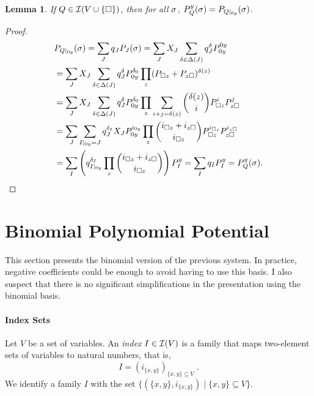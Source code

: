 \documentclass[nocopyrightspace,preprint]{sigplanconf-pldi15}
\newtheorem{lemma}{Lemma}
\begin{document}
\begin{lemma}
If $Q \in \mathcal{I}(V \cup \{\square\})$, then for all $\sigma$,
$P^y_Q(\sigma) = P_{Q|_{0y}}(\sigma)$.
\end{lemma}
\begin{proof}
\begin{align*}
&P_{Q|_{0y}}(\sigma)
  = \sum_J q_J P_J(\sigma)
  = \sum_J X_J \sum_{\delta \in \Delta(J)} q_J^\delta P_{0y}^{0y} \\
&= \sum_J X_J \sum_{\delta \in \Delta(J)}
    q_J^\delta P_{0y}^{\delta_0}
    \prod_z (P_{\square z} + P_{z \square})^{\delta(z)} \\
&= \sum_J X_J \sum_{\delta \in \Delta(J)}
    q_J^\delta P_{0y}^{\delta_0}
    \prod_z \sum_{i+j=\delta(z)} \binom{\delta(z)}{i}
      P_{\square z}^i P_{z \square}^j \\
&= \sum_J \sum_{I|_{0y} = J}
    q_J^{\delta_I} X_J P_{0y}^{i_{0y}}
    \prod_z \binom{i_{\square z} + i_{z \square}}{i_{\square z}}
      P_{\square z}^{i_{\square z}} P_{z \square}^{i_{z \square}} \\
&= \sum_I
    \left( q_{I|_{0y}}^{\delta_I}
    \prod_z \binom{i_{\square z} + i_{z \square}}{i_{\square z}}
    \right) P_I^y
  = \sum_I q_I P_I^y = P^y_Q(\sigma).
\end{align*}
\end{proof}














\clearpage
\section{Binomial Polynomial Potential}

This section presents the binomial version of the previous system.
In practice, negative coefficients could be enough to avoid having to use
this basis.  I also suspect that there is no significant simplifications
in the presentation using the binomial basis.

\paragraph{Index Sets}

Let $V$ be a set of variables.  An \emph{index} $I \in \mathcal{I}(V)$ is a
family that maps two-element sets of variables to natural numbers,
that is,
$$
I = (i_{\{x,y\}})_{\{x,y\} \subseteq V} \; .
$$
%
We identify a family $I$ with the set $\{ (\{x,y\},i_{\{x,y\}})
\mid \{x,y\} \subseteq V\}$.
\end{document}
